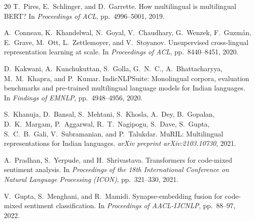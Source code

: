 \documentclass[12pt,a4paper]{report}
\begin{document}
\begin{thebibliography}{20}
T.\ Pires, E.\ Schlinger, and D.\ Garrette.
\newblock How multilingual is multilingual BERT?
\newblock In \textit{Proceedings of ACL}, pp.\ 4996--5001, 2019.

A.\ Conneau, K.\ Khandelwal, N.\ Goyal, V.\ Chaudhary, G.\ Wenzek, F.\ Guzmán, E.\ Grave, M.\ Ott, L.\ Zettlemoyer, and V.\ Stoyanov.
\newblock Unsupervised cross-lingual representation learning at scale.
\newblock In \textit{Proceedings of ACL}, pp.\ 8440--8451, 2020.

D.\ Kakwani, A.\ Kunchukuttan, S.\ Golla, G.\ N.\ C., A.\ Bhattacharyya, M.\ M.\ Khapra, and P.\ Kumar.
\newblock IndicNLPSuite: Monolingual corpora, evaluation benchmarks and pre-trained multilingual language models for Indian languages.
\newblock In \textit{Findings of EMNLP}, pp.\ 4948--4956, 2020.

S.\ Khanuja, D.\ Bansal, S.\ Mehtani, S.\ Khosla, A.\ Dey, B.\ Gopalan, D.\ K.\ Margam, P.\ Aggarwal, R.\ T.\ Nagipogu, S.\ Dave, S.\ Gupta, S.\ C.\ B.\ Gali, V.\ Subramanian, and P.\ Talukdar.
\newblock MuRIL: Multilingual representations for Indian languages.
\newblock \textit{arXiv preprint arXiv:2103.10730}, 2021.

A.\ Pradhan, S.\ Yerpude, and H.\ Shrivastava.
\newblock Transformers for code-mixed sentiment analysis.
\newblock In \textit{Proceedings of the 18th International Conference on Natural Language Processing (ICON)}, pp.\ 321--330, 2021.

V.\ Gupta, S.\ Menghani, and R.\ Mamidi.
\newblock Synapse-embedding fusion for code-mixed sentiment classification.
\newblock In \textit{Proceedings of AACL-IJCNLP}, pp.\ 88--97, 2022.

\end{thebibliography}
\end{document}

